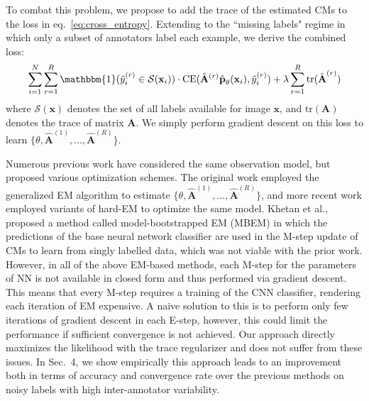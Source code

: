 To combat this problem, we propose to add the trace of the estimated CMs to the loss in eq.~\ref{eq:cross_entropy}. Extending to the ``missing labels" regime in which only a subset of annotators label each example, we derive the combined loss:
\begin{equation}\label{eq:objective_sparse}
\sum_{i=1}^{N}\sum_{r=1}^{R}\mathbbm{1}(\tilde{y}_{i}^{(r)} \in \mathcal{S}(\mathbf{x}_i))\cdot \text{CE}(\hat{\mathbf{A}}^{(r)}\hat{\textbf{p}}_{\theta}(\mathbf{x}_i), \tilde{y}^{(r)}_{i})  + \lambda \sum_{r=1}^{R}\text{tr}(\hat{\textbf{A}}^{(r)})
\end{equation}
where $\mathcal{S}(\mathbf{x})$ denotes the set of all labels available for image $\mathbf{x}$, and $\text{tr}(\mathbf{A})$ denotes the trace of matrix $\mathbf{A}$. We simply perform gradient descent on this loss to learn $\{\theta, \hat{\mathbf{A}}^{(1)}, ..., \hat{\mathbf{A}}^{(R)}\}$.
%

Numerous previous work have considered the same observation model, but proposed various optimization schemes. The original work \cite{raykar2009supervised,raykar2010learning} employed the generalized EM algorithm to estimate $\{\theta, \hat{\mathbf{A}}^{(1)}, ..., \hat{\mathbf{A}}^{(R)}\}$, and more recent work  \cite{branson2017lean,van2018lean} employed variants of hard-EM to optimize the same model. Khetan et al.,\cite{khetan2017learning} proposed a method called model-bootstrapped EM (MBEM) in which the predictions of the base neural network classifier are used in the M-step update of CMs to learn from singly labelled data, which was not viable with the prior work. However, in all of the above EM-based methods, each M-step for the parameters of NN is not available in closed form and thus performed via gradient descent. This means that every M-step requires a training of the CNN classifier, rendering each iteration of EM expensive. A naive solution to this is to perform only few iterations of gradient descent in each E-step, however, this could limit the performance if sufficient convergence is not achieved. Our approach directly maximizes the likelihood with the trace regularizer and does not suffer from these issues. In Sec.~4, we show empirically this approach leads to an improvement both in terms of accuracy and convergence rate over the previous methods on noisy labels with high inter-annotator variability. %

